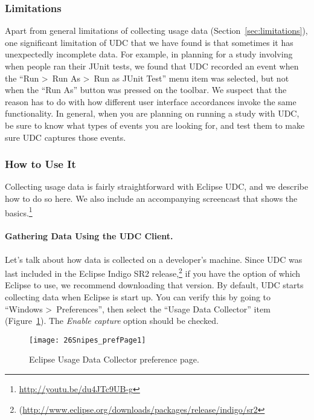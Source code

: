 \subsubsection{Limitations}

Apart from general limitations of collecting usage data (Section~\ref{sec:limitations}),
one significant limitation of UDC that we have found is that sometimes it has
unexpectedly incomplete data.
For example, in planning for a study involving when people ran their JUnit tests,
we found that UDC recorded an event when the ``Run \textgreater~Run As \textgreater~Run as JUnit Test'' menu item was selected,
but not when the ``Run As'' button was pressed on the toolbar.
We suspect that the reason has to do with how different user interface accordances
invoke the same functionality.
In general, when you are planning on running a study with UDC, be sure to know what
types of events you are looking for, and test them to make sure UDC captures those events.

\subsubsection{How to Use It}

\label{SecUDCHowToUseIt}

Collecting usage data is fairly straightforward with Eclipse UDC,
and we describe how to do so here.
We also include an accompanying screencast that shows the
basics.\footnote{\url{http://youtu.be/du4JTc9UB-g}}

\paragraph{Gathering Data Using the UDC Client.}

Let's talk about how data is collected on a developer's machine.
Since UDC was last included in the Eclipse Indigo SR2
release,\footnote{(\url{http://www.eclipse.org/downloads/packages/release/indigo/sr2}}
if you have the option of which Eclipse to use, we recommend downloading
that version.
By default, UDC starts collecting data when Eclipse is start up.
You can verify this by going to ``Windows \textgreater~Preferences'', then
select the ``Usage Data Collector'' item (Figure~\ref{fig:prefPage1}).
The \textit{Enable capture} option should be checked.

\begin{figure}
  \centering
  \texttt{[image: 26Snipes\_prefPage1]}
  \caption{Eclipse Usage Data Collector preference page.}\label{fig:prefPage1}
\end{figure}

